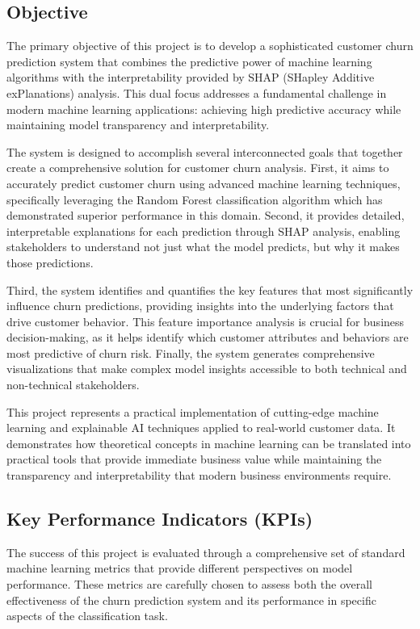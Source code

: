 \documentclass{article}
\begin{document}
\subsection{Objective}

The primary objective of this project is to develop a sophisticated customer churn prediction system that combines the predictive power of machine learning algorithms with the interpretability provided by SHAP (SHapley Additive exPlanations) analysis. This dual focus addresses a fundamental challenge in modern machine learning applications: achieving high predictive accuracy while maintaining model transparency and interpretability.

The system is designed to accomplish several interconnected goals that together create a comprehensive solution for customer churn analysis. First, it aims to accurately predict customer churn using advanced machine learning techniques, specifically leveraging the Random Forest classification algorithm which has demonstrated superior performance in this domain. Second, it provides detailed, interpretable explanations for each prediction through SHAP analysis, enabling stakeholders to understand not just what the model predicts, but why it makes those predictions.

Third, the system identifies and quantifies the key features that most significantly influence churn predictions, providing insights into the underlying factors that drive customer behavior. This feature importance analysis is crucial for business decision-making, as it helps identify which customer attributes and behaviors are most predictive of churn risk. Finally, the system generates comprehensive visualizations that make complex model insights accessible to both technical and non-technical stakeholders.

This project represents a practical implementation of cutting-edge machine learning and explainable AI techniques applied to real-world customer data. It demonstrates how theoretical concepts in machine learning can be translated into practical tools that provide immediate business value while maintaining the transparency and interpretability that modern business environments require.

\subsection{Key Performance Indicators (KPIs)}

The success of this project is evaluated through a comprehensive set of standard machine learning metrics that provide different perspectives on model performance. These metrics are carefully chosen to assess both the overall effectiveness of the churn prediction system and its performance in specific aspects of the classification task.
\end{document}
